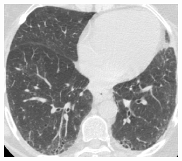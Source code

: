 {\begin{figure}[htbp]
\begin{subfigure}{.25\linewidth}
  \caption{}
  \label{fig:IPFSegmentationResults-c} 
\end{subfigure}
\begin{subfigure}{.32\linewidth}%
  \includegraphics[width=\linewidth,trim={{.0\wd0} {.0\wd0} {.0\wd0} {.0\wd0}},clip]{Segmentation/Image/IPF203_Raw_Axial125.png}
  \caption{}
  \label{fig:IPFSegmentationResults-d} 

\end{subfigure}
\end{figure}}
